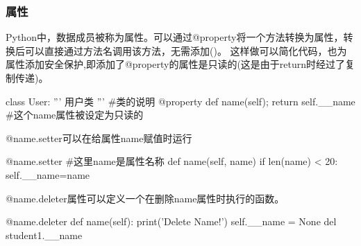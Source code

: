     \subsubsection{属性}
      Python中，数据成员被称为属性。可以通过@property将一个方法转换为属性，转换后可以直接通过方法名调用该方法，无需添加()。
      这样做可以简化代码，也为属性添加安全保护,即添加了@property的属性是只读的(这是由于return时经过了复制传递)。

      \begin{codeblock}[language=python, caption={property of class}]
        class User: 
            ''' 用户类 ''' #类的说明
            @property
            def name(self);
                return self.__name #这个name属性被设定为只读的
      \end{codeblock}

      @name.setter可以在给属性name赋值时运行
      \begin{codeblock}[language=python, caption={setter of class}]
        @name.setter #这里name是属性名称
        def name(self, name)
            if len(name) < 20:
                self.__name=name
      \end{codeblock}

      @name.deleter属性可以定义一个在删除name属性时执行的函数。
      \begin{codeblock}[language=python, caption={deleter}]
        @name.deleter
        def name(self):
            print('Delete Name!')
            self.__name = None
        del student1.__name
      \end{codeblock}

